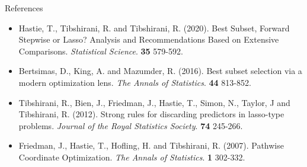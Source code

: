 \documentclass[blue, 10pt]{beamer}
\begin{document}
\begin{frame}{References}

  \begin{itemize}
    \item Hastie, T., Tibshirani, R. and Tibshirani, R. (2020). Best Subset, Forward Stepwise or Lasso? Analysis and Recommendations Based on Extensive Comparisons. \textit{Statistical Science}. \textbf{35} 579-592.
    \item Bertsimas, D., King, A. and Mazumder, R. (2016). Best subset selection via a modern optimization lens. \textit{The Annals of Statistics}. \textbf{44} 813-852.
    \item Tibshirani, R., Bien, J., Friedman, J., Hastie, T., Simon, N., Taylor, J and Tibshirani, R. (2012). Strong rules for discarding predictors in lasso-type problems. \textit{Journal of the Royal Statistics Society}. \textbf{74} 245-266.
    \item Friedman, J., Hastie, T., Hofling, H. and Tibshirani, R. (2007). Pathwise Coordinate Optimization. \textit{The Annals of Statistics}. \textbf{1} 302-332.
  \end{itemize}

\end{frame}
\end{document}
